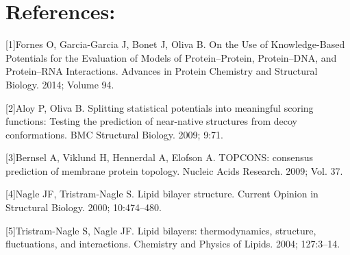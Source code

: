 \documentclass[12pt,titlepage]{article}
\theoremstyle{supercalifragilisticexpialidocious}
\begin{document}
\section{References: }

[1]Fornes O, Garcia-Garcia J, Bonet J, Oliva B. On the Use of Knowledge-Based Potentials for the Evaluation of Models of Protein–Protein, Protein–DNA, and Protein–RNA Interactions. Advances in Protein Chemistry and Structural Biology. 2014; Volume 94.

[2]Aloy P, Oliva B. Splitting statistical potentials into meaningful scoring functions: Testing the prediction of near-native structures from decoy conformations. BMC Structural Biology. 2009; 9:71.

[3]Bernsel A, Viklund H, Hennerdal A, Elofson A. TOPCONS: consensus prediction of membrane protein topology. Nucleic Acids Research. 2009; Vol. 37.

[4]Nagle JF, Tristram-Nagle S. Lipid bilayer structure. Current Opinion in Structural Biology. 2000; 10:474–480.

[5]Tristram-Nagle S, Nagle JF. Lipid bilayers: thermodynamics, structure, fluctuations, and interactions. Chemistry and Physics of Lipids. 2004; 127:3–14.
\end{document}
